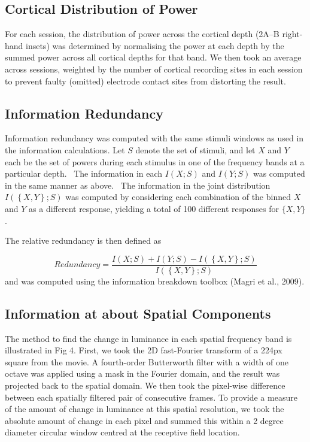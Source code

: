 \documentclass{article}
\begin{document}
\subsection[Cortical Distribution of Power]{Cortical Distribution of Power}
For each session, the distribution of power across the cortical depth (2A--B right-hand insets) was determined by normalising the power at each depth by the summed power across all cortical depths for that band. We then took an average across sessions, weighted by the number of cortical recording sites in each session to prevent faulty (omitted) electrode contact sites from distorting the result.

\subsection{Information Redundancy }
Information redundancy was computed with the same stimuli windows as used in the information calculations. Let  $S$ denote the set of stimuli, and let  $X$ and  $Y$ each be the set of powers during each stimulus in one of the frequency bands at a particular depth. \ The information in each  $I\left(X;S\right)$ and  $I(Y;S)$ was computed in the same manner as above. \ The information in the joint distribution  $I(\left\{X,Y\right\};S)$ was computed by considering each combination of the binned  $X$ and  $Y$ as a different response, yielding a total of 100 different responses for  $\{X,Y\}$.

The relative redundancy is then defined as

\begin{equation*}
\mathit{Redundancy}=\frac{I\left(X;S\right)+I\left(Y;S\right)-I\left(\left\{X,Y\right\};S\right)}{I\left(\left\{X,Y\right\};S\right)}
\end{equation*}
and was computed using the information breakdown toolbox (Magri et al., 2009). 

\subsection{Information at about Spatial Components}
The method to find the change in luminance in each spatial frequency band is illustrated in Fig 4. First, we took the 2D fast-Fourier transform of a 224px square from the movie. A fourth-order Butterworth filter with a width of one octave was applied using a mask in the Fourier domain, and the result was projected back to the spatial domain. We then took the pixel-wise difference between each spatially filtered pair of consecutive frames. To provide a measure of the amount of change in luminance at this spatial resolution, we took the absolute amount of change in each pixel and summed this within a 2 degree diameter circular window centred at the receptive field location.
\end{document}
